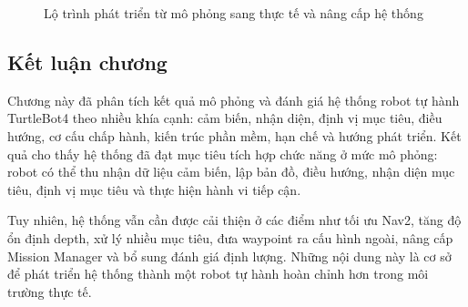 \begin{figure}[H]
\centering
{}
\caption{Lộ trình phát triển từ mô phỏng sang thực tế và nâng cấp hệ thống}
\label{fig:development-roadmap}
\end{figure}

\subsection{Kết luận chương}
\label{subsec:chapter7-conclusion}

Chương này đã phân tích kết quả mô phỏng và đánh giá hệ thống robot tự hành TurtleBot4 theo nhiều khía cạnh: cảm biến, nhận diện, định vị mục tiêu, điều hướng, cơ cấu chấp hành, kiến trúc phần mềm, hạn chế và hướng phát triển. Kết quả cho thấy hệ thống đã đạt mục tiêu tích hợp chức năng ở mức mô phỏng: robot có thể thu nhận dữ liệu cảm biến, lập bản đồ, điều hướng, nhận diện mục tiêu, định vị mục tiêu và thực hiện hành vi tiếp cận.

Tuy nhiên, hệ thống vẫn cần được cải thiện ở các điểm như tối ưu Nav2, tăng độ ổn định depth, xử lý nhiều mục tiêu, đưa waypoint ra cấu hình ngoài, nâng cấp Mission Manager và bổ sung đánh giá định lượng. Những nội dung này là cơ sở để phát triển hệ thống thành một robot tự hành hoàn chỉnh hơn trong môi trường thực tế.
